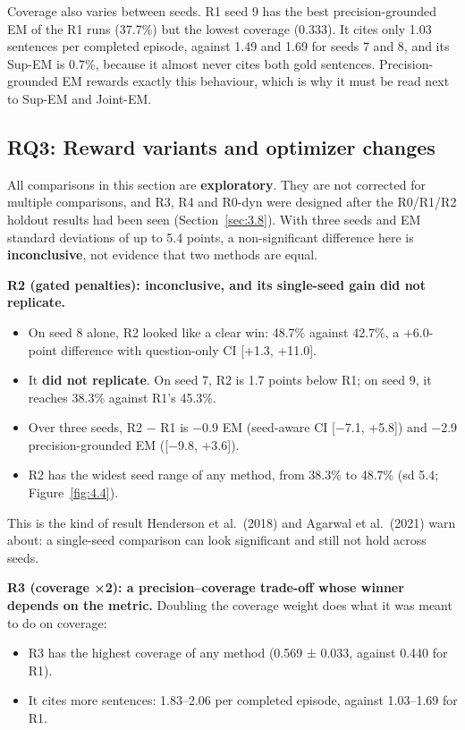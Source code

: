 Coverage also varies between seeds. R1 seed 9 has the best
precision-grounded EM of the R1 runs (37.7\%) but the lowest coverage
(0.333). It cites only 1.03 sentences per completed episode, against
1.49 and 1.69 for seeds 7 and 8, and its Sup-EM is 0.7\%, because it
almost never cites both gold sentences. Precision-grounded EM rewards
exactly this behaviour, which is why it must be read next to Sup-EM and
Joint-EM.

\subsection{RQ3: Reward variants and optimizer changes}\label{sec:4.6}

All comparisons in this section are \textbf{exploratory}. They are not
corrected for multiple comparisons, and R3, R4 and R0-dyn were designed
after the R0/R1/R2 holdout results had been seen
(Section~\ref{sec:3.8}). With three seeds and EM standard deviations of
up to 5.4 points, a non-significant difference here is
\textbf{inconclusive}, not evidence that two methods are equal.

\textbf{R2 (gated penalties): inconclusive, and its single-seed gain did
not replicate.}

\begin{itemize}
\tightlist
\item
  On seed 8 alone, R2 looked like a clear win: 48.7\% against 42.7\%, a
  +6.0-point difference with question-only CI {[}+1.3, +11.0{]}.
\item
  It \textbf{did not replicate}. On seed 7, R2 is 1.7 points below R1;
  on seed 9, it reaches 38.3\% against R1's 45.3\%.
\item
  Over three seeds, R2 − R1 is −0.9 EM (seed-aware CI {[}−7.1, +5.8{]})
  and −2.9 precision-grounded EM ({[}−9.8, +3.6{]}).
\item
  R2 has the widest seed range of any method, from 38.3\% to 48.7\% (sd
  5.4; Figure~\ref{fig:4.4}).
\end{itemize}

This is the kind of result Henderson et al.~(2018) and Agarwal et
al.~(2021) warn about: a single-seed comparison can look significant and
still not hold across seeds.

\textbf{R3 (coverage ×2): a precision--coverage trade-off whose winner
depends on the metric.} Doubling the coverage weight does what it was
meant to do on coverage:

\begin{itemize}
\tightlist
\item
  R3 has the highest coverage of any method (0.569 ± 0.033, against
  0.440 for R1).
\item
  It cites more sentences: 1.83--2.06 per completed episode, against
  1.03--1.69 for R1.
\end{itemize}

